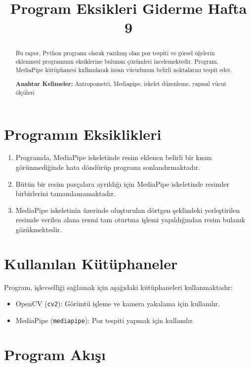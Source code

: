 \documentclass[12pt, a4paper]{article}
\begin{document}
\section{Programın Eksiklikleri}
	\begin{enumerate}
	\item Programda, MediaPipe iskeletinde resim eklenen belirli bir kısım görünmediğinde hata döndürüp programı sonlandırmaktadır.
	\item Bütün bir resim parçalara ayrıldığı için MediaPipe iskeletinde resimler birbirlerini tamamlamamaktadır.
	\item MediaPipe iskeletinin üzerinde oluşturulan dörtgen şeklindeki yerleştirilen resimde verilen alana resmi tam oturtma işlemi yapıldığından resim bulanık gözükmektedir.
\end{enumerate}
\newpage
\title{Program Eksikleri Giderme Hafta 9}
\author{}
\date{}
\maketitle
\setcounter{section}{0}
\begin{abstract}
	\begin{justify}
		Bu rapor, Python programı olarak yazılmış olan poz tespiti ve görsel öğelerin eklenmesi programının eksiklerine bulunan çözümleri incelemektedir. Program, MediaPipe kütüphanesi kullanılarak insan vücudunun belirli noktalarını tespit eder\cite{MediapipeGithubb}.
	\end{justify}
	\textbf{Anahtar Kelimeler:}  Antropometri, Mediapipe, iskelet düzenleme, yapısal vücut ölçüleri
	
	
\end{abstract}
	\section{Kullanılan Kütüphaneler}

Program, işlevselliği sağlamak için aşağıdaki kütüphaneleri kullanmaktadır:

\begin{itemize}
	\item OpenCV (\texttt{cv2}): Görüntü işleme ve kamera yakalama için kullanılır.
	\item MediaPipe (\texttt{mediapipe}): Poz tespiti yapmak için kullanılır.
\end{itemize}

\section{Program Akışı}
\end{document}
